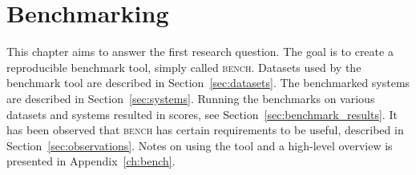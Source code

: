 \chapter{Benchmarking}
\label{ch:benchmarking}

This chapter aims to answer the first research question.
The goal is to create a reproducible benchmark tool, simply called \textsc{bench}.
Datasets used by the benchmark tool are described in Section~\ref{sec:datasets}.
The benchmarked systems are described in Section~\ref{sec:systems}.
Running the benchmarks on various datasets and systems resulted in scores, see Section~\ref{sec:benchmark_results}.
It has been observed that \textsc{bench} has certain requirements to be useful, described in Section~\ref{sec:observations}.
Notes on using the tool and a high-level overview is presented in Appendix~\ref{ch:bench}.








